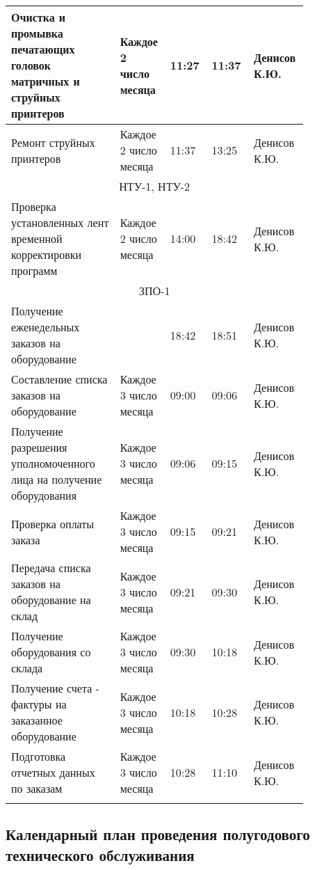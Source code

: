 \documentclass[a4paper,14pt]{extarticle}
\begin{document}
\begin{longtable}{|p{0.35\linewidth}|p{0.1\linewidth}|p{0.1\linewidth}|p{0.13\linewidth}|p{0.17\linewidth}|}
		Очистка и промывка печатающих головок матричных и струйных принтеров  & Каждое 2 число месяца & 11:27 & 11:37 & Денисов К.Ю. \\ \hline
		Ремонт струйных принтеров  & Каждое 2 число месяца & 11:37 & 13:25 & Денисов К.Ю. \\ \hline
		\multicolumn{ 5}{|c|}{НТУ-1, НТУ-2} \\ \hline
		Проверка установленных лент временной корректировки программ  & Каждое 2 число месяца & 14:00 & 18:42 & Денисов К.Ю. \\ \hline
		\multicolumn{ 5}{|c|}{ЗПО-1} \\ \hline
		Получение еженедельных заказов на оборудование  &  & 18:42 & 18:51 & Денисов К.Ю. \\ \hline
		Составление списка заказов на оборудование  & Каждое 3 число месяца & 09:00 & 09:06 & Денисов К.Ю. \\ \hline
		Получение разрешения уполномоченного лица на получение оборудования  & Каждое 3 число месяца & 09:06 & 09:15 & Денисов К.Ю. \\ \hline
		Проверка оплаты заказа  & Каждое 3 число месяца & 09:15 & 09:21 & Денисов К.Ю. \\ \hline
		Передача списка заказов на оборудование на склад  & Каждое 3 число месяца & 09:21 & 09:30 & Денисов К.Ю. \\ \hline
		Получение оборудования со склада  & Каждое 3 число месяца & 09:30 & 10:18 & Денисов К.Ю. \\ \hline
		Получение счета - фактуры на заказанное оборудование  & Каждое 3 число месяца & 10:18 & 10:28 & Денисов К.Ю. \\ \hline
		Подготовка отчетных данных по заказам  & Каждое 3 число месяца & 10:28 & 11:10 & Денисов К.Ю. \\ \hline

		\label{tab:calendar-month}
	\end{longtable}



	\vspace{12ex}
\subsection*{Календарный план проведения полугодового технического обслуживания}
	\vspace{3ex}
\end{document}

